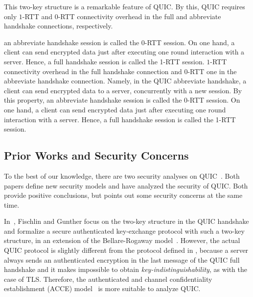 This two-key structure is a remarkable feature of QUIC. 
By this, QUIC requires only  $1$-RTT and $0$-RTT connectivity overhead in the full and 
abbreviate handshake connections, respectively.


%
an abbreviate handshake session is called
the 0-RTT session. On one hand, 
a client can send encrypted data just after executing one round interaction with a server.
Hence, a full handshake session is called the 1-RTT session.
$1$-RTT connectivity overhead in the full handshake connection and 
$0$-RTT one in the abbreviate handshake connection.
Namely, in the QUIC abbreviate handshake, a client can send
encrypted data to a server, concurrently with a new session.
By this property, an abbreviate handshake session is called
the 0-RTT session. On one hand, 
a client can send encrypted data just after executing one round interaction with a server.
Hence, a full handshake session is called the 1-RTT session.
\fi
\subsection{Prior Works and Security Concerns} \label{sec:concern}
To the best of our knowledge, there are two security analyses on QUIC~\cite{FG14:QUIC,LJBN15:QUIC}.
Both papers define new security models and have analyzed the security of QUIC. 
Both provide positive conclusions, but 
\cite{LJBN15:QUIC} points out some security concerns at the same time. 

In~\cite{FG14:QUIC}, Fischlin and Gunther focus on the two-key structure in the QUIC handshake 
and formalize a secure authenticated key-exchange protocol with such a two-key structure, 
in an extension  of the Bellare-Rogaway model~\cite{BR93:AKE}. 
However, the actual QUIC protocol is slightly different from the protocol defined in \cite{FG14:QUIC}, 
because a server always sends an authenticated encryption in the last message of 
the QUIC full handshake and   
it makes impossible to obtain \textit{key-indistinguishability}, as with the case of TLS. 
Therefore, the authenticated and channel confidentiality
establishment (ACCE) model~\cite{JKSS12:ACCE} is more
suitable to analyze QUIC.

